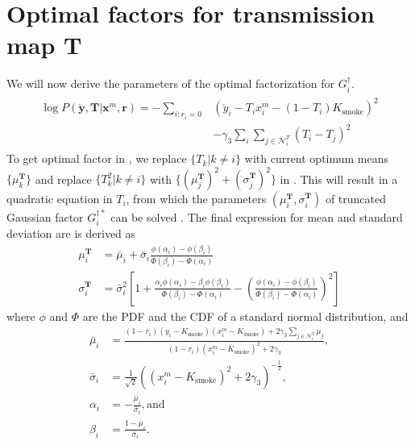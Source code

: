 \appendix

\chapter{Optimal factors for transmission map $\mathbf{T}$ }
\label{app:factorParamsT}

We will now derive the parameters of the optimal factorization for $G^\dagger_i$.
\begin{align}
\begin{split}
\log P \left( \mathbf{\mathring y}, \mathbf{T} | \mathbf{x}^m, \mathbf{r} \right) = - \sum_{i: r_i = 0} &\left( \mathring{y}_i - T_i x^m_i - (1-T_i) K_\text{smoke} \right)^2 \\ &- \gamma_3 \sum_{i} \sum_{j \in \mathcal{N}_i^T} (T_i - T_j)^2
\end{split}
\label{eqn:derive_1_factvbem1}
\end{align}
To get optimal factor in , we replace $ \lbrace T_k | k \neq i \rbrace $ with current optimum means $ \lbrace \mu^\mathbf{T}_k \rbrace$ and replace $ \lbrace T_k^2 | k \neq i \rbrace $ with $ \lbrace \left(\mu^\mathbf{T}_j\right)^2 + \left(\sigma^\mathbf{T}_j\right)^2 \rbrace $ in . This will result in a quadratic equation in $T_i$, from which the parameters $ \left( \mu^\mathbf{T}_i, \sigma^\mathbf{T}_i \right) $ of truncated Gaussian factor $G^{\dagger*}_i$ can be solved \cite{johnson1994continuous}. The final expression for mean and standard deviation are is derived as
\begin{align}
\mu^\mathbf{T}_i &= \bar\mu_i + \bar\sigma_i \frac{\phi\left(\alpha_i \right) - \phi\left(\beta_i \right)}{\Phi\left(\beta_i \right) - \Phi\left(\alpha_i \right)} \label{eqn:mean_t_vbem1} \\
%
\sigma^\mathbf{T}_i &= \bar\sigma_i^2 \left[ 1 + \frac{\alpha_i \phi\left(\alpha_i \right) - \beta_i  \phi\left(\beta_i \right)}{\Phi\left(\beta_i \right) - \Phi\left(\alpha_i \right)} - \left(\frac{\phi\left(\alpha_i \right) - \phi\left(\beta_i \right)}{\Phi\left(\beta_i \right) - \Phi\left(\alpha_i \right)} \right)^2 \right] \label{eqn:std_t_vbem1}
\end{align}
where $\phi$ and $\Phi$ are the PDF and the CDF of a standard normal distribution, and
\begin{align*}
\bar{\mu}_i &= \frac{ \left( 1-r_i \right) \left( y_i - K_\text{smoke} \right) \left( x^m_i - K_\text{smoke} \right) + 2 \gamma_3 \sum_{ j \in \mathcal{N}_i^T } \mu_j } { \left( 1 - r_i \right) \left( x^m_i - K_\text{smoke} \right)^2 + 2 \gamma_3}, \\
\bar{\sigma}_i &= \frac{ 1 } { \sqrt{2} }\left( \left( x^m_i - K_\text{smoke} \right)^2 + 2 \gamma_3 \right)^{-\frac{1}{2}},  \\
\alpha_i &= -\frac{\bar\mu_i}{\bar\sigma_i}, \text{and} \\
\beta_i &= \frac{1-\bar\mu_i}{\bar\sigma_i}.
\end{align*}



